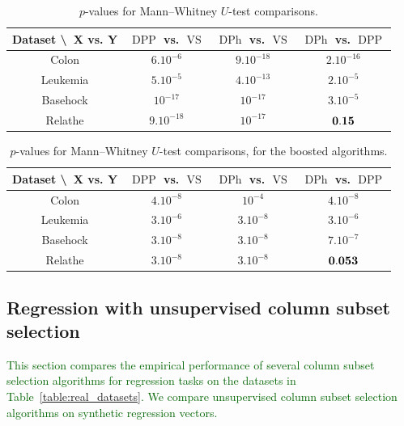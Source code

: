 \documentclass[twoside,11pt]{book}
\newcommand{\rev}[1]{\textcolor{darkgreen}{#1}}
\numberwithin{theorem}{chapter}
\numberwithin{definition}{chapter}
\numberwithin{proposition}{chapter}
\numberwithin{corollary}{chapter}
\numberwithin{example}{chapter}
\numberwithin{lemma}{chapter}
\DeclareMathOperator{\DPP}{\mathrm{DPP}}
\DeclareMathOperator{\VS}{\mathrm{VS}}
\DeclareMathOperator{\DPh}{\mathrm{DPh}}
\begin{document}
\begin{table}[h]
\centering
 \begin{tabular}{| c| c | c| c|}
 \hline
  Dataset \textbackslash ~X vs. Y & $\DPP$ vs. $\VS$ & $\DPh$ vs. $\VS$  & $\DPh$ vs. $\DPP$\\
 \hline
 Colon & $6.10^{-6}$ & $9.10^{-18}$  & $2.10^{-16}$\\
 \hline
 Leukemia & $5.10^{-5}$ & $4.10^{-13}$ & $2.10^{-5}$\\
 \hline
 Basehock & $10^{-17}$ &$10^{-17}$ & $3.10^{-5}$ \\
 \hline
 Relathe & $9.10^{-18}$ & $10^{-17}$ & $\bf 0.15$\\
 \hline
\end{tabular}
\caption{$p$-values for Mann–Whitney $U$-test comparisons.
\label{t:tests}}
\end{table}

\begin{table}[h]
\centering
 \begin{tabular}{| c| c | c| c|}
   \hline
    Dataset \textbackslash ~X vs. Y & $\DPP$ vs. $\VS$ & $\DPh$ vs. $\VS$  & $\DPh$ vs. $\DPP$\\
 \hline
 Colon & $4.10^{-8}$ & $10^{-4}$  & $4.10^{-8}$\\
 \hline
 Leukemia & $3.10^{-6}$ & $3.10^{-8}$ & $3.10^{-6}$\\
 \hline
 Basehock & $3.10^{-8}$ &$3.10^{-8}$ & $7.10^{-7}$ \\
 \hline
 Relathe & $3.10^{-8}$ & $3.10^{-8}$ & $\bf 0.053$\\
 \hline
\end{tabular}
\caption{
$p$-values for Mann–Whitney $U$-test comparisons, for the boosted algorithms.
\label{t:tests_boosted}
}
\end{table}

\subsection{Regression with unsupervised column subset selection} \label{sec:num_sim_regression_1}
\rev{
This section compares the empirical performance of several column subset selection algorithms for regression tasks on the datasets in Table~\ref{table:real_datasets}. We compare unsupervised column subset selection algorithms on synthetic regression vectors.}
\end{document}
